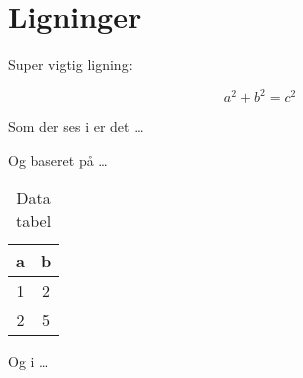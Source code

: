\section{Ligninger}

Super vigtig ligning:

\begin{equation}\label{eq:vigtig-ligning}
    a^2 + b^2 = c^2
\end{equation}

Som der ses i  er det \dots 

Og baseret på  \dots

\begin{table}[H]
    \centering
    \begin{tabular}{c|c}
        \hline
        \textbf{a} & \textbf{b}  \\
        \hline
        1 & 2 \\
        2 & 5 \\
        \hline
    \end{tabular}
    \caption{Data tabel}
    \label{tab:data}
\end{table}

Og i  \dots
